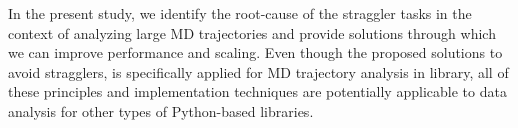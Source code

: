 In the present study, we identify the root-cause of the straggler tasks in the context of analyzing large MD trajectories and provide solutions through which we can improve performance and scaling.
Even though the proposed solutions to avoid stragglers, is specifically applied for MD trajectory analysis in  library, all of these principles and implementation techniques are potentially applicable to data analysis for other types of Python-based libraries.


